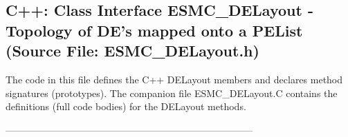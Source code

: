  
\parskip        0pt
\parindent      0pt
\baselineskip  11pt
 
\def\bv{\begin{verbatim}}
\def\ev{\end{verbatim}}
\def\be{\begin{equation}}
\def\ee{\end{equation}}
\def\bea{\begin{eqnarray}}
\def\eea{\end{eqnarray}}
\def\bi{\begin{itemize}}
\def\ei{\end{itemize}}
\def\bn{\begin{enumerate}}
\def\en{\end{enumerate}}
\def\bd{\begin{description}}
\def\ed{\end{description}}
\def\({\left (}
\def\){\right )}
\def\[{\left [}
\def\]{\right ]}
\def\<{\left  \langle}
\def\>{\right \rangle}
\def\cI{{\cal I}}
\def\diag{\mathop{\rm diag}}
\def\tr{\mathop{\rm tr}}


 
\subsection{C++:  Class Interface ESMC\_DELayout - Topology of DE's mapped onto a PEList (Source File: ESMC\_DELayout.h)}


  
  
   The code in this file defines the C++ DELayout members and declares method 
   signatures (prototypes).  The companion file ESMC\_DELayout.C contains
   the definitions (full code bodies) for the DELayout methods.
  
   
  
  -----------------------------------------------------------------------------
   
